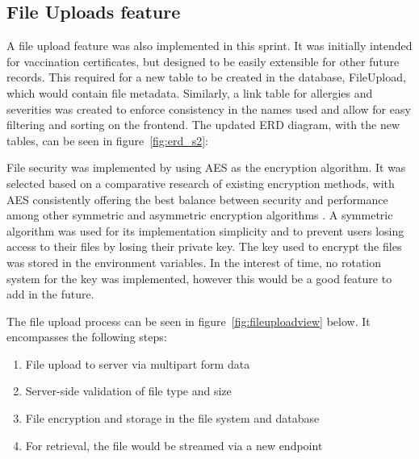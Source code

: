 \subsection{File Uploads feature}

A file upload feature was also implemented in this sprint. It was initially intended for vaccination certificates, but designed to be easily extensible for other future records. This required for a new table to be created in the database, FileUpload, which would contain file metadata. Similarly, a link table for allergies and severities was created to enforce consistency in the names used and allow for easy filtering and sorting on the frontend. The updated ERD diagram, with the new tables, can be seen in figure~\ref{fig:erd_s2}:

\noindent\begin{minipage}{\textwidth}
  \begin{center}
      \label{fig:erd_s2}
  \end{center}
\end{minipage}

File security was implemented by using AES as the encryption algorithm. It was selected based on a comparative research of existing encryption methods, with AES consistently offering the best balance between security and performance among other symmetric and asymmetric encryption algorithms \parencite{crypt1,crypt2,crypt3}. A symmetric algorithm was used for its implementation simplicity and to prevent users losing access to their files by losing their private key. The key used to encrypt the files was stored in the environment variables. In the interest of time, no rotation system for the key was implemented, however this would be a good feature to add in the future. 

The file upload process can be seen in figure~\ref{fig:fileuploadview} below. It encompasses the following steps:

\begin{enumerate}
  \item File upload to server via multipart form data
  \item Server-side validation of file type and size
  \item File encryption and storage in the file system and database
  \item For retrieval, the file would be streamed via a new endpoint
\end{enumerate}

